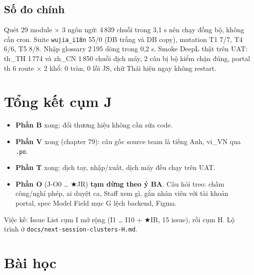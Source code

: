 \subsection*{Số đo chính}
Quét 29 module $\times$ 3 ngôn ngữ: 4\,839 chuỗi trong 3,1 s nên chạy đồng bộ, không cần cron. Suite \texttt{wujia\_i18n} 55/0
(DB trắng và DB copy), mutation T1 7/7, T4 6/6, T5 8/8. Nhập glossary 2\,195 dòng trong 0,2 s. Smoke DeepL thật trên UAT:
th\_TH 1\,774 và zh\_CN 1\,850 chuỗi dịch máy, 2 câu bị bộ kiểm chặn đúng, portal th 6 route $\times$ 2 khổ: 0 tràn, 0 lỗi JS,
chữ Thái hiện ngay không restart.

\section{Tổng kết cụm J}

\begin{itemize}[nosep]
\item \textbf{Phần B} xong: đổi thương hiệu không cần sửa code.
\item \textbf{Phần V} xong (chapter 79): câu gốc source team là tiếng Anh, vi\_VN qua \texttt{.po}.
\item \textbf{Phần T} xong: dịch tay, nhập/xuất, dịch máy đều chạy trên UAT.
\item \textbf{Phần O} (J-O0 \ldots{} ★JR) \textbf{tạm dừng theo ý BA}. Câu hỏi treo: chấm công/nghỉ phép, ai duyệt ca, Staff xem gì,
  gắn nhân viên với tài khoản portal, spec Model Field mục G lệch backend, Figma.
\end{itemize}
Việc kế: Issue List cụm I mở rộng (I1 \ldots{} I10 + ★IR, 15 issue), rồi cụm H. Lộ trình ở \texttt{docs/next-session-clusters-H.md}.

\section{Bài học}

